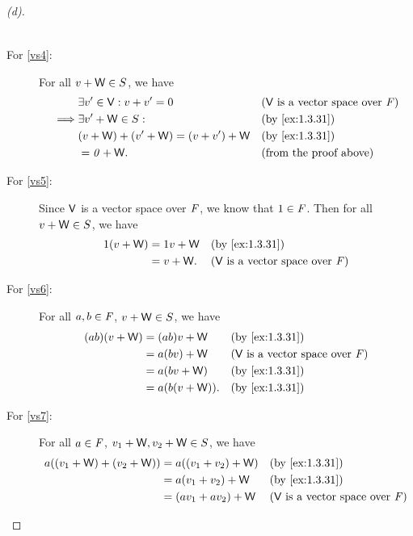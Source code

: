 \begin{proof}[(d)]
\begin{description}
\begin{align*}
			\end{align*}
		\item[For \ref{vs4}:]
			For all \(v + \mathsf{W} \in S\), we have
			\begin{align*}
				         & \exists v' \in \V : v + v' = 0       &  & \text{(\(\V\) is a vector space over \(\F\))} \\
				\implies & \exists v' + \W \in S :              &  & \by{ex:1.3.31}                                \\
				         & (v + \W) + (v' + \W) = (v + v') + \W &  & \by{ex:1.3.31}                                \\
				         & = \zv + \W.                          &  & \text{(from the proof above)}
			\end{align*}
		\item[For \ref{vs5}:]
			Since \(\mathsf{V}\) is a vector space over \(\mathit{F}\), we know that \(1 \in \mathit{F}\).
			Then for all \(v + \mathsf{W} \in S\), we have
			\begin{align*}
				1(v + \W) & = 1v + \W &  & \by{ex:1.3.31}                                \\
				          & = v + \W. &  & \text{(\(\V\) is a vector space over \(\F\))}
			\end{align*}
		\item[For \ref{vs6}:]
			For all \(a, b \in \mathit{F}\), \(v + \mathsf{W} \in S\), we have
			\begin{align*}
				(ab) (v + \W) & = (ab)v + \W    &  & \by{ex:1.3.31}                                \\
				              & = a(bv) + \W    &  & \text{(\(\V\) is a vector space over \(\F\))} \\
				              & = a(bv + \W)    &  & \by{ex:1.3.31}                                \\
				              & = a(b(v + \W)). &  & \by{ex:1.3.31}
			\end{align*}
		\item[For \ref{vs7}:]
			For all \(a \in \mathit{F}\), \(v_1 + \mathsf{W}, v_2 + \mathsf{W} \in S\), we have
			\begin{align*}
				a((v_1 + \W) + (v_2 + \W)) & = a((v_1 + v_2) + \W)        &  & \by{ex:1.3.31}                                \\
				                           & = a(v_1 + v_2) + \W          &  & \by{ex:1.3.31}                                \\
				                           & = (av_1 + av_2) + \W         &  & \text{(\(\V\) is a vector space over \(\F\))} \\

\end{align*}
\end{description}
\end{proof}
